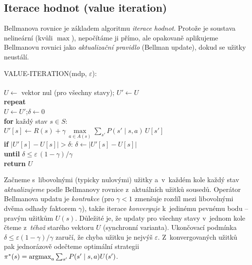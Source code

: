 \subsection{Iterace hodnot (value iteration)}

Bellmanova rovnice je základem algoritmu \emph{iterace hodnot}. Protože je soustava nelineární (kvůli $\max$), nepočítáme ji přímo, ale opakovaně aplikujeme Bellmanovu rovnici jako \emph{aktualizační pravidlo} (Bellman update), dokud se užitky neustálí.

\begin{algo}
\ttfamily\small
VALUE-ITERATION(mdp, $\varepsilon$):\\
\hspace*{1.5em}\\
\hspace*{1.5em}$U \leftarrow$ vektor nul (pro všechny stavy); $U' \leftarrow U$\\
\hspace*{1.5em}\textbf{repeat}\\
\hspace*{3em}$U \leftarrow U'$;\quad $\delta \leftarrow 0$ \\
\hspace*{3em}\textbf{for} každý stav $s \in S$:\\
\hspace*{4.5em}$U'[s] \leftarrow R(s) + \gamma\,\max\limits_{a\in A(s)} \sum\limits_{s'} P(s'\mid s,a)\,U[s']$ \\
\hspace*{4.5em}\textbf{if} $|U'[s]-U[s]| > \delta$: $\delta \leftarrow |U'[s]-U[s]|$\\
\hspace*{1.5em}\textbf{until} $\delta \le \varepsilon\,(1-\gamma)/\gamma$\\
\hspace*{1.5em}\textbf{return} $U$
\end{algo}

\begin{intuice}
Začneme s~libovolnými (typicky nulovými) užitky a~v~každém kole každý stav \emph{aktualizujeme} podle Bellmanovy rovnice z~aktuálních užitků sousedů. Operátor Bellmanova updatu je \emph{kontrakce} (pro $\gamma<1$ zmenšuje rozdíl mezi libovolnými dvěma odhady faktorem $\gamma$), takže iterace \emph{konverguje} k~jedinému pevnému bodu -- pravým užitkům $U(s)$. Důležité je, že updaty pro všechny stavy v~jednom kole čteme z~\emph{téhož} starého vektoru $U$ (synchronní varianta). Ukončovací podmínka $\delta\le\varepsilon(1-\gamma)/\gamma$ zaručí, že chyba užitku je nejvýš $\varepsilon$. Z~konvergovaných užitků pak jednorázově odečteme optimální strategii $\pi^\ast(s)=\operatorname*{argmax}_a\sum_{s'}P(s'\mid s,a)U(s')$.
\end{intuice}

